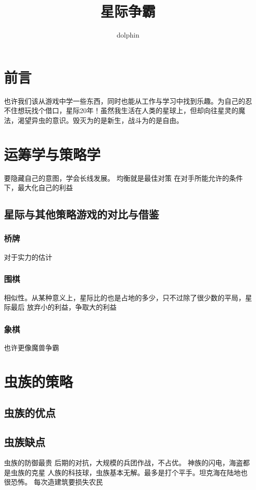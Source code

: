 \documentclass{ctexart}
\begin{document}
\title{星际争霸}
\author{dolphin} 
\maketitle

\tableofcontents

\begin{abstract}

\end{abstract}

\section{前言}
也许我们该从游戏中学一些东西，同时也能从工作与学习中找到乐趣。为自己的忍不住想玩找个借口，星际20年！虽然我生活在人类的星球上，但却向往星灵的魔法，渴望异虫的意识。毁灭为的是新生，战斗为的是自由。
\section{运筹学与策略学}
要隐藏自己的意图，学会长线发展。
均衡就是最佳对策
在对手所能允许的条件下，最大化自己的利益

\subsection{星际与其他策略游戏的对比与借鉴}
\subsubsection{桥牌}
对于实力的估计
\subsubsection{围棋}
相似性。从某种意义上，星际比的也是占地的多少，只不过除了很少数的平局，星际最后
放弃小的利益，争取大的利益
\subsubsection{象棋}
也许更像魔兽争霸

\section{虫族的策略}
\subsection{虫族的优点 }
\subsection{虫族缺点}
虫族的防御最贵
后期的对抗，大规模的兵团作战，不占优。
神族的闪电，海盗都是虫族的克星
人族的科技球，虫族基本无解。最多是打个平手。坦克海在陆地也很恐怖。
每次造建筑要损失农民
\end{document}
